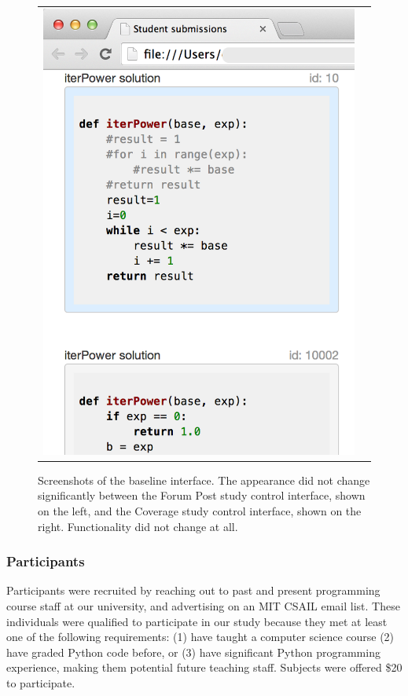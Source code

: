 \begin{figure}[h!]
\begin{tabular}{cc}
\includegraphics[scale=0.37]{Body/figures/overcode/iterPowerEdXControlStudy2.png} \\
\end{tabular}
\caption{Screenshots of the baseline interface. The appearance did not change significantly between the Forum Post study control interface, shown on the left, and the Coverage study control interface, shown on the right. Functionality did not change at all.}
\label{iterPowerEdXControl}
\end{figure}

\subsubsection{Participants}

Participants were recruited by reaching out to past and present programming course staff at our university, and advertising on an MIT CSAIL email list. These individuals were qualified to participate in our study because they met at least one of the following requirements: (1) have taught a computer science course (2) have graded Python code before, or (3) have significant Python programming experience, making them potential future teaching staff. Subjects were offered \$20 to participate. 

